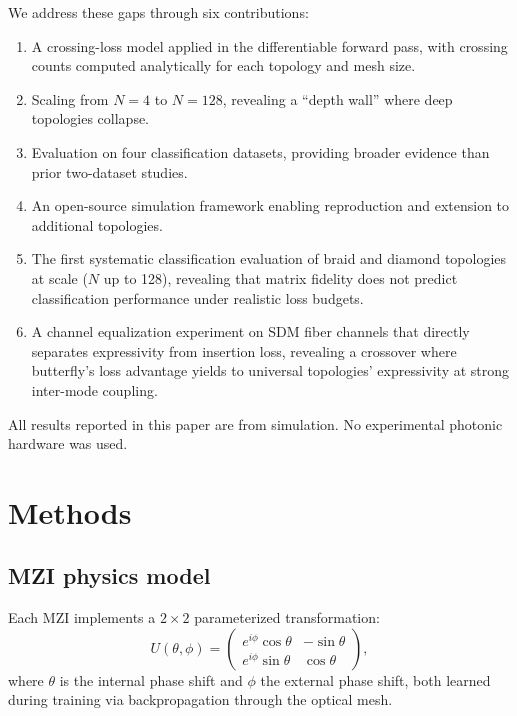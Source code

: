 \documentclass[11pt,a4paper]{article}
\begin{document}
We address these gaps through six contributions:
\begin{enumerate}
  \item A crossing-loss model applied in the differentiable forward pass, with crossing
        counts computed analytically for each topology and mesh size.
  \item Scaling from $N{=}4$ to $N{=}128$, revealing a ``depth wall'' where deep
        topologies collapse.
  \item Evaluation on four classification datasets, providing broader
        evidence than prior two-dataset studies.
  \item An open-source simulation framework enabling reproduction and
        extension to additional topologies.
  \item The first systematic classification evaluation of braid and diamond
        topologies at scale ($N$ up to 128), revealing that matrix fidelity does
        not predict classification performance under realistic loss budgets.
  \item A channel equalization experiment on SDM fiber channels that
        directly separates expressivity from insertion loss, revealing
        a crossover where butterfly's loss advantage yields to universal
        topologies' expressivity at strong inter-mode coupling.
\end{enumerate}

All results reported in this paper are from simulation.  No experimental photonic
hardware was used.

\section{Methods}
\label{sec:methods}

\subsection{MZI physics model}
\label{sec:mzi}

Each MZI implements a $2 \times 2$ parameterized transformation:
\begin{equation}
U(\theta, \phi) = \begin{pmatrix}
  e^{i\phi}\cos\theta & -\sin\theta \\
  e^{i\phi}\sin\theta & \cos\theta
\end{pmatrix},
\label{eq:mzi}
\end{equation}
where $\theta$ is the internal phase shift and $\phi$ the external phase shift, both
learned during training via backpropagation through the optical mesh.
\end{document}
